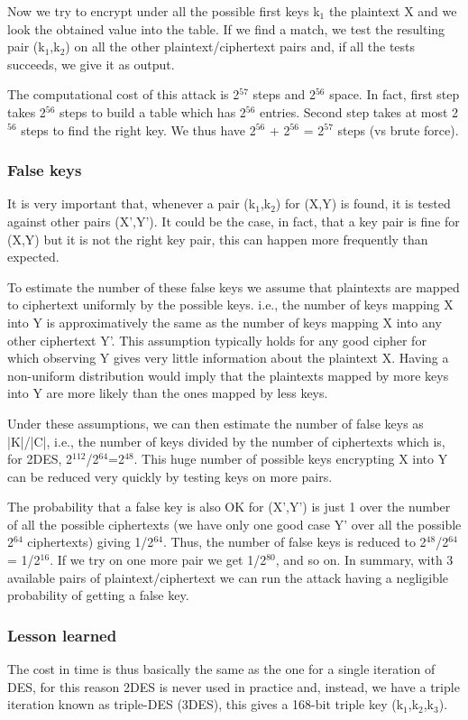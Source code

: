 \documentclass[a4paper, 12pt]{report}
\begin{document}
Now we try to encrypt under all the possible first keys k$_1$ the plaintext X and we look the obtained value into the table. If we find a match, we test the resulting pair (k$_1$,k$_2$) on all the other plaintext/ciphertext pairs and, if all the tests succeeds, we give it as output.

The computational cost of this attack is 2$^{57}$ steps and 2$^{56}$ space. In fact, first step takes 2$^{56}$ steps to build a table which has 2$^{56}$ entries. Second step takes at most 2$^{56}$ steps to find the right key. We thus have 2$^{56}$ + 2$^{56}$ = 2$^{57}$ steps (vs brute force).

\subsubsection{False keys}
It is very important that, whenever a pair (k$_1$,k$_2$) for (X,Y) is found, it is tested against other pairs (X',Y'). It could be the case, in fact, that a key pair is fine for (X,Y) but it is not the right key pair, this can happen more frequently than expected.

To estimate the number of these false keys we assume that plaintexts are mapped to ciphertext uniformly by the possible keys. i.e., the number of keys mapping X into Y is approximatively the same as the number of keys mapping X into any other ciphertext Y'. This assumption typically holds for any good cipher for which observing Y gives very little information about the plaintext X. Having a non-uniform distribution would imply that the plaintexts
mapped by more keys into Y are more likely than the ones mapped by less keys.

Under these assumptions, we can then estimate the number of false keys as |K|/|C|, i.e., the number of keys divided by the number of ciphertexts which is, for 2DES, 2$^{112}$/2$^{64}$=2$^{48}$. This huge number of possible keys encrypting X into Y can be reduced very quickly by testing keys on more pairs.

The probability that a false key is also OK for (X',Y') is just 1 over the number of all the possible ciphertexts (we have only one good case Y' over all the possible 2$^{64}$ ciphertexts) giving 1/2$^{64}$. Thus, the number of false keys is reduced to 2$^{48}$/2$^{64}$ = 1/2$^{16}$. If we try on one more pair we get 1/2$^{80}$, and so on. In summary, with 3 available pairs of plaintext/ciphertext we can run the attack having a negligible probability of getting a false key.

\subsubsection{Lesson learned}
The cost in time is thus basically the same as the one for a single iteration of DES, for this reason 2DES is never used in practice and, instead, we have a triple iteration known as triple-DES (3DES), this gives a 168-bit triple key (k$_1$,k$_2$,k$_3$).
\end{document}
